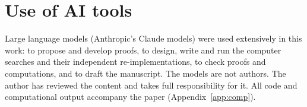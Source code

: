 \documentclass[11pt]{amsart}
\theoremstyle{definition}
\theoremstyle{remark}
\theoremstyle{plain}
\begin{document}






\appendix


\section*{Use of AI tools}

\noindent Large language models (Anthropic's Claude models) were used extensively in this work: to propose and develop proofs, to design, write and run the computer searches and their independent re-implementations, to check proofs and computations, and to draft the manuscript. The models are not authors. The author has reviewed the content and takes full responsibility for it. All code and computational output accompany the paper (Appendix~\ref{app:comp}).
\end{document}
